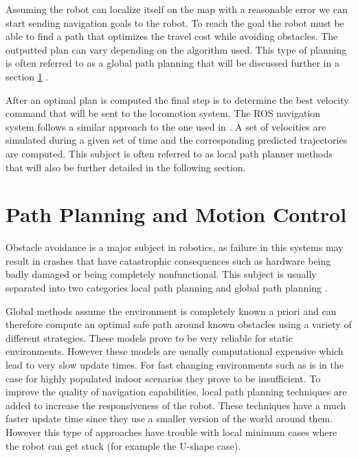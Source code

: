 Assuming the robot can localize itself on the map with a reasonable error we can start sending navigation goals to the robot. To reach the goal the robot must be able to find a path that optimizes the travel cost while avoiding obstacles. The outputted plan can vary depending on the algorithm used. This type of planning is often referred to as a global path planning that will be discussed further in a section \ref{ppmc} .

After an optimal plan is computed the final step is to determine the best velocity command that will be sent to the locomotion system.  The ROS navigation system follows a similar approach to the one used in \cite{gerkey2008planning}. A set of velocities are simulated during a given set of time and the corresponding predicted trajectories are  computed. This subject is often referred to as local path planner methods that will also be further detailed in the following section.


\section{Path Planning and Motion Control}\label{ppmc}
 Obstacle avoidance is a major subject in robotics, as failure in this systems may result in crashes that have catastrophic consequences such as hardware being badly damaged or being completely nonfunctional. This subject is usually separated into two categories local path planning and global path planning \cite{foxdwa}.
 
 
 Global methods assume the environment is completely known a priori and can therefore compute an optimal safe path  around known obstacles using a variety of different strategies. These models prove to be very reliable for static environments. However these models are usually computational expensive which lead to very slow update times. For fast changing environments such as is in the case for highly populated indoor scenarios they prove to be insufficient. 
 To improve the quality of navigation capabilities, local path planning techniques are added to increase the responsiveness of the robot. These techniques have a much faster update time  since they use a smaller version of the world around them. However this type of approaches have trouble with local minimum cases where the robot can get stuck (for example the U-shape case).
